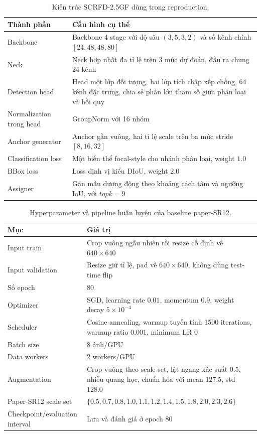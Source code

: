 \begin{table}[H]
\centering
\caption{Kiến trúc SCRFD-2.5GF dùng trong reproduction.}
\small
\begin{tabular}{@{}p{}p{}@{}}
\toprule
\textbf{Thành phần} & \textbf{Cấu hình cụ thể} \\
\midrule
Backbone & Backbone 4 stage với độ sâu \((3,5,3,2)\) và số kênh chính \([24,48,48,80]\) \\
\midrule
Neck & Neck hợp nhất đa tỉ lệ trên 3 mức dự đoán, đầu ra chung 24 kênh \\
\midrule
Detection head & Head một lớp đối tượng, hai lớp tích chập xếp chồng, 64 kênh đặc trưng, chia sẻ phần lớn tham số giữa phân loại và hồi quy \\
\midrule
Normalization trong head & GroupNorm với 16 nhóm \\
\midrule
Anchor generator & Anchor gần vuông, hai tỉ lệ scale trên ba mức stride \([8,16,32]\) \\
\midrule
Classification loss & Một biến thể focal-style cho nhánh phân loại, weight \(1.0\) \\
\midrule
BBox loss & Loss định vị kiểu DIoU, weight \(2.0\) \\
\midrule
Assigner & Gán mẫu dương động theo khoảng cách tâm và ngưỡng IoU, với \(topk=9\) \\
\bottomrule
\end{tabular}
\end{table}

\begin{table}[H]
\centering
\caption{Hyperparameter và pipeline huấn luyện của baseline paper-SR12.}
\small
\begin{tabular}{@{}p{}p{}@{}}
\toprule
\textbf{Mục} & \textbf{Giá trị} \\
\midrule
Input train & Crop vuông ngẫu nhiên rồi resize cố định về \(640\times640\) \\
\midrule
Input validation & Resize giữ tỉ lệ, pad về \(640\times640\), không dùng test-time flip \\
\midrule
Số epoch & 80 \\
\midrule
Optimizer & SGD, learning rate \(0.01\), momentum \(0.9\), weight decay \(5\times10^{-4}\) \\
\midrule
Scheduler & Cosine annealing, warmup tuyến tính 1500 iterations, warmup ratio \(0.001\), minimum LR \(0\) \\
\midrule
Batch size & 8 ảnh/GPU \\
\midrule
Data workers & 2 workers/GPU \\
\midrule
Augmentation & Crop vuông theo scale set, lật ngang xác suất \(0.5\), nhiễu quang học, chuẩn hóa với mean \(127.5\), std \(128.0\) \\
\midrule
Paper-SR12 scale set & \(\{0.5, 0.7, 0.8, 1.0, 1.1, 1.2, 1.4, 1.5, 1.8, 2.0, 2.3, 2.6\}\) \\
\midrule
Checkpoint/evaluation interval & Lưu và đánh giá ở epoch 80 \\
\bottomrule
\end{tabular}
\end{table}

